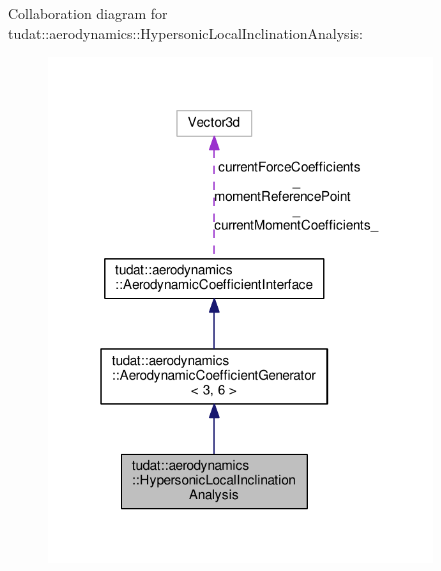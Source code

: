 Collaboration diagram for tudat\+:\+:aerodynamics\+:\+:Hypersonic\+Local\+Inclination\+Analysis\+:
\nopagebreak
\begin{figure}[H]
\begin{center}
\leavevmode
\includegraphics[width=289pt]{classtudat_1_1aerodynamics_1_1HypersonicLocalInclinationAnalysis__coll__graph}
\end{center}
\end{figure}
